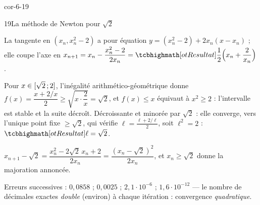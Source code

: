 \begin{blocLivre}{cor-6-19}
\begin{corrige}{19}{La méthode de Newton pour $\sqrt2$}
\noindent
\begin{minipage}[c]{0.6\linewidth}
\begin{questions}
  \item La tangente en $(x_n,x_n^{2}-2)$ a pour équation
    $y=(x_n^{2}-2)+2x_n(x-x_n)$ ; elle coupe l'axe en
    $x_{n+1}=x_n-\dfrac{x_n^{2}-2}{2x_n}
    =\res{\dfrac12\Bigl(x_n+\dfrac{2}{x_n}\Bigr)}$.
  \item Pour $x\in\mathopen{[}\sqrt2\,{;}\,2\mathclose{]}$, l'inégalité arithmético-géométrique
    donne $f(x)=\dfrac{x+2/x}{2}\geq\sqrt{x\cdot\dfrac2x}=\sqrt2$, et
    $f(x)\leq x$ équivaut à $x^{2}\geq2$ : l'intervalle est stable et la
    suite décroît. Décroissante et minorée par $\sqrt2$ : elle converge,
    vers l'unique point fixe $\geq\sqrt2$, qui vérifie $\ell=\frac{\ell+2/\ell}{2}$,
    soit $\ell^{2}=2$ : $\res{\ell=\sqrt2}$.
  \item $x_{n+1}-\sqrt2=\dfrac{x_n^{2}-2\sqrt2\,x_n+2}{2x_n}
    =\dfrac{(x_n-\sqrt2)^{2}}{2x_n}$, et $x_n\geq\sqrt2$ donne la
    majoration annoncée.
  \item Erreurs successives : $0{,}0858$ ; $0{,}0025$ ; $2{,}1\cdot10^{-6}$ ;
    $1{,}6\cdot10^{-12}$ — le nombre de décimales exactes \emph{double}
    (environ) à chaque itération : convergence \emph{quadratique}.
\end{questions}
\end{minipage}\hfill
\begin{minipage}[c]{0.36\linewidth}
\centering
{}\\[0.5mm]
\end{minipage}
\end{corrige}
\end{blocLivre}

